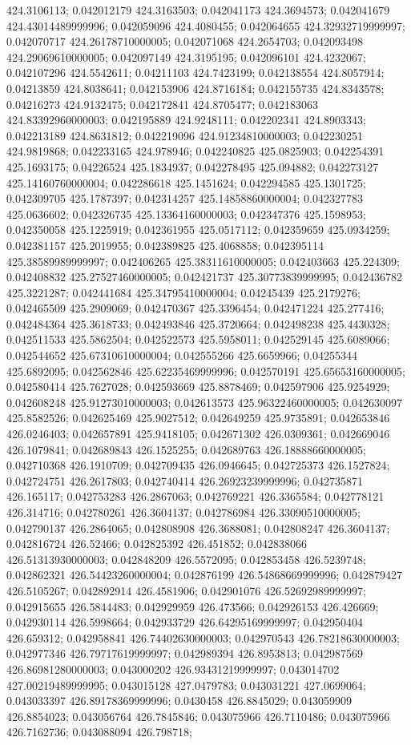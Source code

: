 424.3106113; 0.042012179 424.3163503; 0.042041173 424.3694573; 0.042041679 424.43014489999996; 0.042059096 424.4080455; 0.042064655 424.32932719999997; 0.042070717 424.26178710000005; 0.042071068 424.2654703; 0.042093498 424.29069610000005; 0.042097149 424.3195195; 0.042096101 424.4232067; 0.042107296 424.5542611; 0.04211103 424.7423199; 0.042138554 424.8057914; 0.04213859 424.8038641; 0.042153906 424.8716184; 0.042155735 424.8343578; 0.04216273 424.9132475; 0.042172841 424.8705477; 0.042183063 424.83392960000003; 0.042195889 424.9248111; 0.042202341 424.8903343; 0.042213189 424.8631812; 0.042219096 424.91234810000003; 0.042230251 424.9819868; 0.042233165 424.978946; 0.042240825 425.0825903; 0.042254391 425.1693175; 0.04226524 425.1834937; 0.042278495 425.094882; 0.042273127 425.14160760000004; 0.042286618 425.1451624; 0.042294585 425.1301725; 0.042309705 425.1787397; 0.042314257 425.14858860000004; 0.042327783 425.0636602; 0.042326735 425.13364160000003; 0.042347376 425.1598953; 0.042350058 425.1225919; 0.042361955 425.0517112; 0.042359659 425.0934259; 0.042381157 425.2019955; 0.042389825 425.4068858; 0.042395114 425.38589989999997; 0.042406265 425.38311610000005; 0.042403663 425.224309; 0.042408832 425.27527460000005; 0.042421737 425.30773839999995; 0.042436782 425.3221287; 0.042441684 425.34795410000004; 0.04245439 425.2179276; 0.042465509 425.2909069; 0.042470367 425.3396454; 0.042471224 425.277416; 0.042484364 425.3618733; 0.042493846 425.3720664; 0.042498238 425.4430328; 0.042511533 425.5862504; 0.042522573 425.5958011; 0.042529145 425.6089066; 0.042544652 425.67310610000004; 0.042555266 425.6659966; 0.04255344 425.6892095; 0.042562846 425.62235469999996; 0.042570191 425.65653160000005; 0.042580414 425.7627028; 0.042593669 425.8878469; 0.042597906 425.9254929; 0.042608248 425.91273010000003; 0.042613573 425.96322460000005; 0.042630097 425.8582526; 0.042625469 425.9027512; 0.042649259 425.9735891; 0.042653846 426.0246403; 0.042657891 425.9418105; 0.042671302 426.0309361; 0.042669046 426.1079841; 0.042689843 426.1525255; 0.042689763 426.18888660000005; 0.042710368 426.1910709; 0.042709435 426.0946645; 0.042725373 426.1527824; 0.042724751 426.2617803; 0.042740414 426.26923239999996; 0.042735871 426.165117; 0.042753283 426.2867063; 0.042769221 426.3365584; 0.042778121 426.314716; 0.042780261 426.3604137; 0.042786984 426.33090510000005; 0.042790137 426.2864065; 0.042808908 426.3688081; 0.042808247 426.3604137; 0.042816724 426.52466; 0.042825392 426.451852; 0.042838066 426.51313930000003; 0.042848209 426.5572095; 0.042853458 426.5239748; 0.042862321 426.54423260000004; 0.042876199 426.54868669999996; 0.042879427 426.5105267; 0.042892914 426.4581906; 0.042901076 426.52692989999997; 0.042915655 426.5844483; 0.042929959 426.473566; 0.042926153 426.426669; 0.042930114 426.5998664; 0.042933729 426.64295169999997; 0.042950404 426.659312; 0.042958841 426.74402630000003; 0.042970543 426.78218630000003; 0.042977346 426.79717619999997; 0.042989394 426.8953813; 0.042987569 426.86981280000003; 0.043000202 426.93431219999997; 0.043014702 427.00219489999995; 0.043015128 427.0479783; 0.043031221 427.0699064; 0.043033397 426.89178369999996; 0.0430458 426.8845029; 0.043059909 426.8854023; 0.043056764 426.7845846; 0.043075966 426.7110486; 0.043075966 426.7162736; 0.043088094 426.798718; 